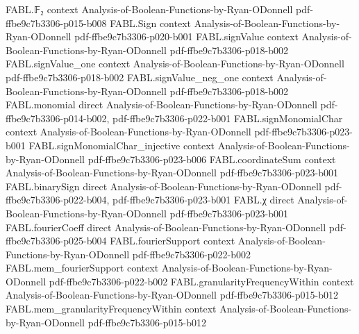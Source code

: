 \begin{theorem}
\label{FABL.booleanInfluence_tribesCritical}
\leanok
{}
\proofstep
  {FABL.𝔽₂}
  {context}
  {Analysis-of-Boolean-Functions-by-Ryan-ODonnell}
  {pdf-ffbe9c7b3306-p015-b008}
\proofstep
  {FABL.Sign}
  {context}
  {Analysis-of-Boolean-Functions-by-Ryan-ODonnell}
  {pdf-ffbe9c7b3306-p020-b001}
\proofstep
  {FABL.signValue}
  {context}
  {Analysis-of-Boolean-Functions-by-Ryan-ODonnell}
  {pdf-ffbe9c7b3306-p018-b002}
\proofstep
  {FABL.signValue_one}
  {context}
  {Analysis-of-Boolean-Functions-by-Ryan-ODonnell}
  {pdf-ffbe9c7b3306-p018-b002}
\proofstep
  {FABL.signValue_neg_one}
  {context}
  {Analysis-of-Boolean-Functions-by-Ryan-ODonnell}
  {pdf-ffbe9c7b3306-p018-b002}
\proofstep
  {FABL.monomial}
  {direct}
  {Analysis-of-Boolean-Functions-by-Ryan-ODonnell}
  {pdf-ffbe9c7b3306-p014-b002,
    pdf-ffbe9c7b3306-p022-b001}
\proofstep
  {FABL.signMonomialChar}
  {context}
  {Analysis-of-Boolean-Functions-by-Ryan-ODonnell}
  {pdf-ffbe9c7b3306-p023-b001}
\proofstep
  {FABL.signMonomialChar_injective}
  {context}
  {Analysis-of-Boolean-Functions-by-Ryan-ODonnell}
  {pdf-ffbe9c7b3306-p023-b006}
\proofstep
  {FABL.coordinateSum}
  {context}
  {Analysis-of-Boolean-Functions-by-Ryan-ODonnell}
  {pdf-ffbe9c7b3306-p023-b001}
\proofstep
  {FABL.binarySign}
  {direct}
  {Analysis-of-Boolean-Functions-by-Ryan-ODonnell}
  {pdf-ffbe9c7b3306-p022-b004,
    pdf-ffbe9c7b3306-p023-b001}
\proofstep
  {FABL.χ}
  {direct}
  {Analysis-of-Boolean-Functions-by-Ryan-ODonnell}
  {pdf-ffbe9c7b3306-p023-b001}
\proofstep
  {FABL.fourierCoeff}
  {direct}
  {Analysis-of-Boolean-Functions-by-Ryan-ODonnell}
  {pdf-ffbe9c7b3306-p025-b004}
\proofstep
  {FABL.fourierSupport}
  {context}
  {Analysis-of-Boolean-Functions-by-Ryan-ODonnell}
  {pdf-ffbe9c7b3306-p022-b002}
\proofstep
  {FABL.mem_fourierSupport}
  {context}
  {Analysis-of-Boolean-Functions-by-Ryan-ODonnell}
  {pdf-ffbe9c7b3306-p022-b002}
\proofstep
  {FABL.granularityFrequencyWithin}
  {context}
  {Analysis-of-Boolean-Functions-by-Ryan-ODonnell}
  {pdf-ffbe9c7b3306-p015-b012}
\proofstep
  {FABL.mem_granularityFrequencyWithin}
  {context}
  {Analysis-of-Boolean-Functions-by-Ryan-ODonnell}
  {pdf-ffbe9c7b3306-p015-b012}
\proofstep

\end{theorem}
